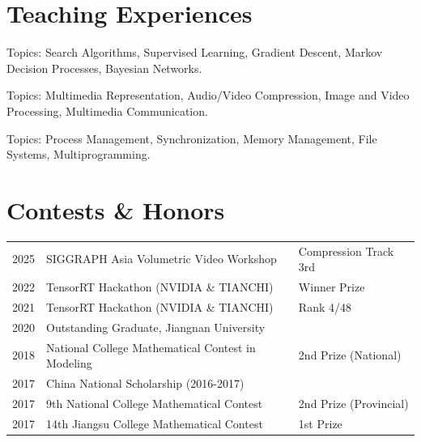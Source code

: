\documentclass[]{deedy-resume-openfont}
\begin{document}
\begin{minipage}[t]{0.74\textwidth}
\section{Teaching Experiences}
\begin{tightemize}
  \item Topics: Search Algorithms, Supervised Learning, Gradient Descent, Markov Decision Processes, Bayesian Networks.
\end{tightemize}

\begin{tightemize}
  \item Topics: Multimedia Representation, Audio/Video Compression, Image and Video Processing, Multimedia Communication.
\end{tightemize}

\begin{tightemize}
  \item Topics: Process Management, Synchronization, Memory Management, File Systems, Multiprogramming.
\end{tightemize}

\section{Contests \& Honors}
\begin{tabular}{lll}
2025 & SIGGRAPH Asia Volumetric Video Workshop & Compression Track 3rd \\
2022 & TensorRT Hackathon (NVIDIA \& TIANCHI) & Winner Prize \\
2021 & TensorRT Hackathon (NVIDIA \& TIANCHI) & Rank 4/48 \\
2020 & Outstanding Graduate, Jiangnan University & \\
2018 & National College Mathematical Contest in Modeling & 2nd Prize (National) \\
2017 & China National Scholarship (2016-2017) & \\
2017 & 9th National College Mathematical Contest & 2nd Prize (Provincial) \\
2017 & 14th Jiangsu College Mathematical Contest & 1st Prize \\
\end{tabular}

\end{minipage}
\end{document}
